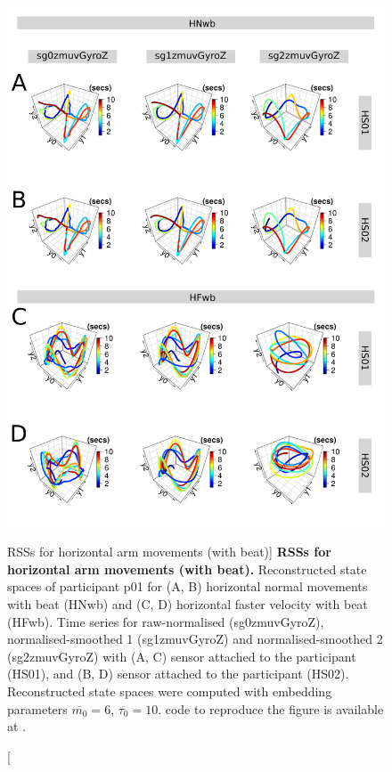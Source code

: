 \begin{figure}
\centering
\includegraphics[height=0.8\textheight]{fig_5_06}
\caption
	[RSSs for horizontal arm movements (with beat)]{
	{\bf RSSs for horizontal arm movements (with beat).}
	Reconstructed state spaces of participant p01 for 
	(A, B) horizontal normal movements with beat (HNwb) and 
	(C, D) horizontal faster velocity with beat (HFwb).
	Time series for raw-normalised (sg0zmuvGyroZ), 
	normalised-smoothed 1 (sg1zmuvGyroZ) and 
	normalised-smoothed 2 (sg2zmuvGyroZ) with
	(A, C) sensor attached to the participant (HS01), and
	(B, D) sensor attached to the participant (HS02).	
	Reconstructed state spaces were computed with 
	embedding parameters $\overline{m_0}=6$, $\overline{\tau_0}=10$.
	\R code to reproduce the figure is available at 
	.
        }
     \label{fig:rss_Hwb_w500}
\end{figure}

